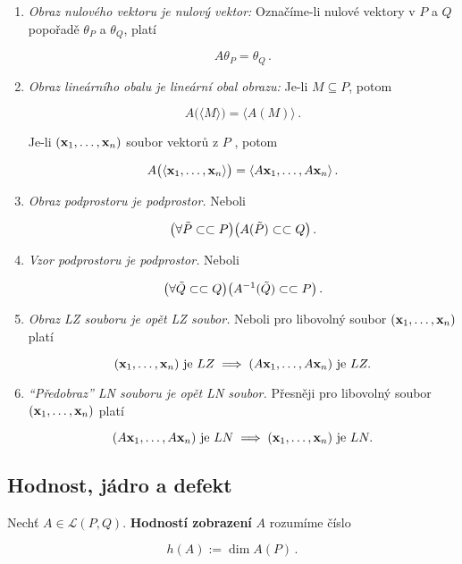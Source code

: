 \begin{enumerate}
      \item \emph{Obraz nulového vektoru je nulový vektor:}  Označíme-li nulové vektory v $P$ a $Q$ popořadě $\theta_P$ a $\theta_Q$, platí

            \[ A\theta_P=\theta_Q\,. \]

      \item \emph{Obraz lineárního obalu je lineární obal obrazu:} Je-li $M\subseteq P$, potom

            \[ A\big(\langle M\rangle \big)=\big\langle A(M)\big\rangle \,. \]

            Je-li $(\mathbf{x}_1,\dots,\mathbf{x}_n)$ soubor vektorů z $P$ , potom

            \[ A\big(\langle \mathbf{x}_1,\dots,\mathbf{x}_n\rangle \big)=\langle A\mathbf{x}_1,\dots,A\mathbf{x}_n\rangle \,. \]

      \item \emph{Obraz podprostoru je podprostor.} Neboli

            \[ \big(\forall \tilde{P}\subset \subset P\big) \big(A(\tilde{P})\subset \subset Q\big)\,. \]

      \item \emph{Vzor podprostoru je podprostor.} Neboli

            \[ \big(\forall \tilde{Q}\subset \subset Q\big) \big(A^{-1}(\tilde{Q})\subset \subset P\big)\,. \]

      \item \emph{Obraz LZ souboru je opět LZ soubor.} Neboli pro libovolný soubor $(\mathbf{x}_1,\dots,\mathbf{x}_n)$ platí

            \[ (\mathbf{x}_1,\dots,\mathbf{x}_n)\text{ je } LZ \implies (A\mathbf{x}_1,\dots,A\mathbf{x}_n)\text{ je } LZ. \]

      \item \emph{``Předobraz'' LN souboru je opět LN soubor.} Přesněji pro libovolný soubor $(\mathbf{x}_1,\dots,\mathbf{x}_n)$ platí

            \[ (A\mathbf{x}_1,\dots,A\mathbf{x}_n)\text{ je } LN \implies (\mathbf{x}_1,\dots,\mathbf{x}_n)\text{ je } LN. \]

\end{enumerate}

\subsection*{Hodnost, jádro a defekt}

Nechť $A\in\mathcal L(P,Q)$. \textbf{Hodností zobrazení} $A$ rozumíme číslo

\[ h(A):=\dim A(P)\,. \]

